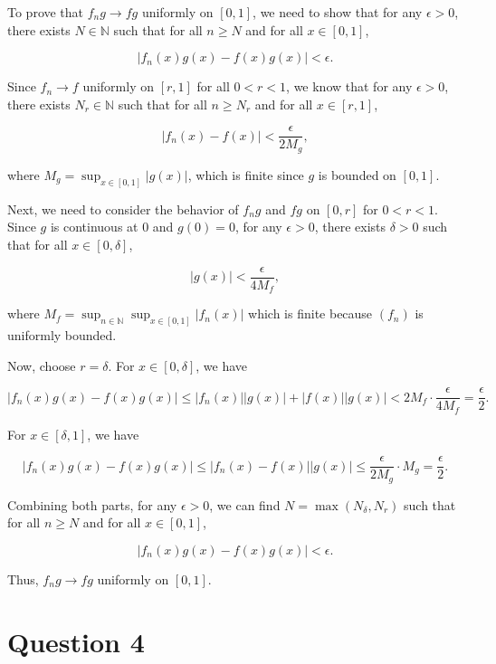 \documentclass{article}
\begin{document}
\begin{proofbox}

    To prove that \( f_n g \to fg \) uniformly on \([0, 1]\), we need to show that for any \(\epsilon > 0\), there exists \(N \in \mathbb{N}\) such that for all \(n \geq N\) and for all \(x \in [0, 1]\),

    \[
    |f_n(x)g(x) - f(x)g(x)| < \epsilon.
    \]
    
    Since \( f_n \to f \) uniformly on \([r, 1]\) for all \(0 < r < 1\), we know that for any \(\epsilon > 0\), there exists \(N_r \in \mathbb{N}\) such that for all \(n \geq N_r\) and for all \(x \in [r, 1]\),
    
    \[
    |f_n(x) - f(x)| < \frac{\epsilon}{2M_g},
    \]
    
    where \(M_g = \sup_{x \in [0, 1]} |g(x)|\), which is finite since \(g\) is bounded on \([0, 1]\).
    
    Next, we need to consider the behavior of \(f_n g\) and \(fg\) on \([0, r]\) for \(0 < r < 1\). Since \(g\) is continuous at 0 and \(g(0) = 0\), for any \(\epsilon > 0\), there exists \(\delta > 0\) such that for all \(x \in [0, \delta]\),
    
    \[
    |g(x)| < \frac{\epsilon}{4M_f},
    \]
    
    where \(M_f = \sup_{n \in \mathbb{N}} \sup_{x \in [0, 1]} |f_n(x)|\) which is finite because \((f_n)\) is uniformly bounded.
    
    Now, choose \(r = \delta\). For \(x \in [0, \delta]\), we have
    
    \[
    |f_n(x)g(x) - f(x)g(x)| \leq |f_n(x)| |g(x)| + |f(x)| |g(x)| < 2M_f \cdot \frac{\epsilon}{4M_f} = \frac{\epsilon}{2}.
    \]
    
    For \(x \in [\delta, 1]\), we have
    
    \[
    |f_n(x)g(x) - f(x)g(x)| \leq |f_n(x) - f(x)| |g(x)| \leq \frac{\epsilon}{2M_g} \cdot M_g = \frac{\epsilon}{2}.
    \]
    
    Combining both parts, for any \(\epsilon > 0\), we can find \(N = \max(N_\delta, N_r)\) such that for all \(n \geq N\) and for all \(x \in [0, 1]\),
    
    \[
    |f_n(x)g(x) - f(x)g(x)| < \epsilon.
    \]
    
    Thus, \(f_n g \to fg\) uniformly on \([0, 1]\).
    

\end{proofbox}
\section{Question 4}
\end{document}
